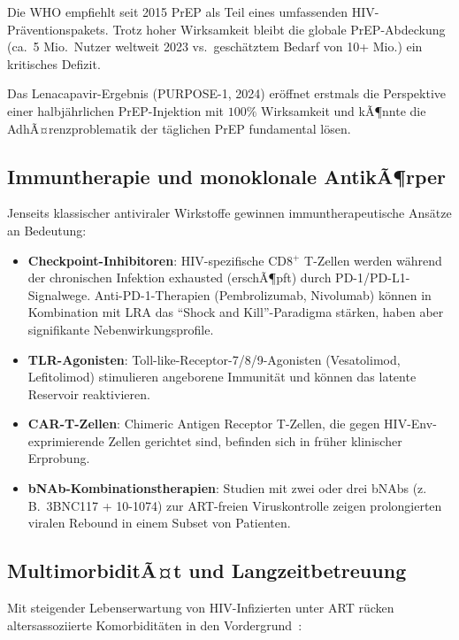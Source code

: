 ﻿\documentclass[a4paper,12pt]{article}
\theoremstyle{definition}
\begin{document}
Die WHO empfiehlt seit 2015 PrEP als Teil eines umfassenden HIV-Pr\"aventionspakets.
Trotz hoher Wirksamkeit bleibt die globale PrEP-Abdeckung (ca.\ 5 Mio.\ Nutzer weltweit
2023 vs.\ gesch\"atztem Bedarf von 10+ Mio.) ein kritisches Defizit.

Das Lenacapavir-Ergebnis (PURPOSE-1, 2024) er\"offnet erstmals die Perspektive
einer halbj\"ahrlichen PrEP-Injektion mit $100\%$ Wirksamkeit und kÃ¶nnte die
AdhÃ¤renzproblematik der t\"aglichen PrEP fundamental l\"osen.

\subsection{Immuntherapie und monoklonale AntikÃ¶rper}

Jenseits klassischer antiviraler Wirkstoffe gewinnen immuntherapeutische Ans\"atze
an Bedeutung:

\begin{itemize}
\item \textbf{Checkpoint-Inhibitoren}: HIV-spezifische CD8$^+$ T-Zellen werden w\"ahrend
      der chronischen Infektion exhausted (erschÃ¶pft) durch PD-1/PD-L1-Signalwege.
      Anti-PD-1-Therapien (Pembrolizumab, Nivolumab) k\"onnen in Kombination mit
      LRA das ``Shock and Kill''-Paradigma st\"arken, haben aber signifikante
      Nebenwirkungsprofile.

\item \textbf{TLR-Agonisten}: Toll-like-Receptor-7/8/9-Agonisten (Vesatolimod,
      Lefitolimod) stimulieren angeborene Immunit\"at und k\"onnen das latente
      Reservoir reaktivieren.

\item \textbf{CAR-T-Zellen}: Chimeric Antigen Receptor T-Zellen, die gegen
      HIV-Env-exprimierende Zellen gerichtet sind, befinden sich in fr\"uher
      klinischer Erprobung.

\item \textbf{bNAb-Kombinationstherapien}: Studien mit zwei oder drei bNAbs
      (z.\,B.\ 3BNC117 + 10-1074) zur ART-freien Viruskontrolle zeigen
      prolongierten viralen Rebound in einem Subset von Patienten.
\end{itemize}

\subsection{MultimorbiditÃ¤t und Langzeitbetreuung}

Mit steigender Lebenserwartung von HIV-Infizierten unter ART r\"ucken altersassoziierte
Komorbidit\"aten in den Vordergrund~\cite{bekker2023hiv}:
\end{document}
